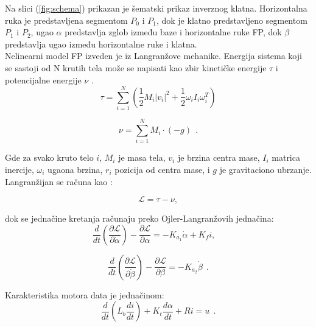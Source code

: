 \documentclass[a4paper,11pt]{article}
\theoremstyle{definition} \newtheorem{deff}{Definicija}[section]
\theoremstyle{definition} \newtheorem{prim}[deff]{Primer}
\theoremstyle{plain} \newtheorem{teor}[deff]{Teorema}
\begin{document}
	
	Na slici (\ref{fig:schema}) prikazan je šematski prikaz inverznog klatna. Horizontalna ruka je predstavljena segmentom $P_0$ i $P_1$, dok je klatno predstavljeno segmentom $P_1$ i $P_2$, ugao $\alpha$ predstavlja zglob između baze i horizontalne ruke FP, dok $\beta$ predstavlja ugao između horizontalne ruke i klatna.
	\\
	
	Nelinearni model FP izveden je iz Langranžove mehanike. Energija sistema koji se sastoji od N krutih tela može se napisati kao zbir kinetičke energije $\tau$ i potencijalne energije $\nu$ \cite{inicijalna}. 
	\begin{equation}
		\tau = \sum_{i=1}^{N} \left( \frac{1}{2} M_i |v_i|^2 + \frac{1}{2} \omega_i I_i \omega_i^T \right)
	\end{equation}
	
	\begin{equation}
		\nu = \sum_{i=1}^{N} M_i \cdot (-g)~~.
	\end{equation}
	
	
	
	Gde za svako kruto telo $i$, $M_i$ je masa tela, $v_i$ je brzina centra mase, $I_i$ matrica inercije, $\omega_i$ ugaona brzina, $r_i$ pozicija od centra mase, i $g$ je gravitaciono ubrzanje.\\
	
	\newpage
	Langranžijan se računa kao :
	
	\begin{equation}
		\mathcal{L} = \tau - \nu, 
	\end{equation}
	
	dok se jednačine kretanja računaju preko Ojler-Langranžovih jednačina: 
	\begin{equation}
		\frac{d}{dt} \left(\frac{\partial \mathcal{L}}{\partial \dot\alpha}\right) - \frac{\partial \mathcal{L}}{\partial \alpha} = -K_{a_1} \dot\alpha + K_f i, \quad 
	\end{equation}
	
	\begin{equation}
		\frac{d}{dt} \left( \frac{\partial \mathcal{L}}{\partial \dot\beta} \right) - \frac{\partial \mathcal{L}}{\partial \beta} = -K_{a_2} \dot\beta~~.
	\end{equation}
	
	Karakteristika motora data je jednačinom: 
	\begin{equation}
		\frac{d}{dt} \left( L_b \frac{di}{dt} \right) + K_t \frac{d\alpha}{dt} + R i = u~~.
	\end{equation}
	
\end{document}

